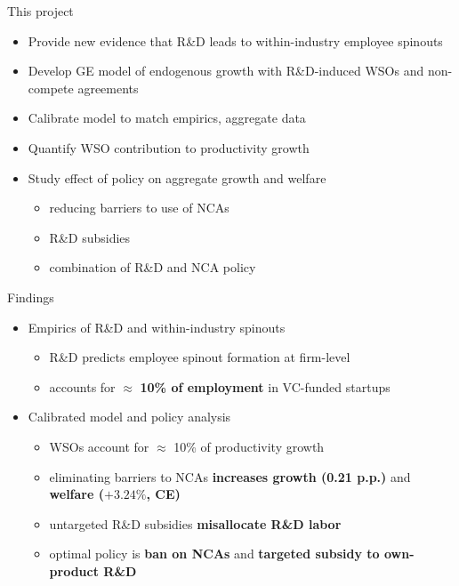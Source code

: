 \documentclass[english,usenames,dvipsnames]{beamer}
\begin{document}
\begin{frame}{This project}
\begin{itemize}
	\item Provide new evidence that R\&D leads to within-industry employee spinouts
	\smallskip
	\item Develop GE model of endogenous growth with R\&D-induced WSOs and non-compete agreements
	\smallskip
	\item Calibrate model to match empirics, aggregate data
	\smallskip
	\item Quantify WSO contribution to productivity growth
	\smallskip
	\item Study effect of policy on aggregate growth and welfare
	\begin{itemize}
		\item reducing barriers to use of NCAs
		\item R\&D subsidies 
		\item combination of R\&D and NCA policy
	\end{itemize}
\end{itemize}
\end{frame}

\begin{frame}{Findings}\label{intro_findings}
	\begin{itemize}
		\item Empirics of R\&D and within-industry spinouts
		\begin{itemize}
			\smallskip
			\item R\&D predicts employee spinout formation at firm-level
			\smallskip
			\item accounts for $\approx$ \alert{\textbf{10\% of employment}} in VC-funded startups   
		\end{itemize}
		\medskip
		\item Calibrated model and policy analysis
		\begin{itemize}
			\smallskip
			\item WSOs account for $\approx$ 10\% of productivity growth
			\smallskip
			\item eliminating barriers to NCAs \alert{\textbf{increases growth (0.21 p.p.)}} and \alert{\textbf{welfare ($+3.24\%$, CE)}}
			\smallskip
			\item untargeted R\&D subsidies \alert{\textbf{misallocate R\&D labor}}
			\smallskip
			\item optimal policy is \alert{\textbf{ban on NCAs}} and \alert{\textbf{targeted subsidy to own-product R\&D}} 
		\end{itemize}
	\end{itemize}
\end{frame}
\end{document}
